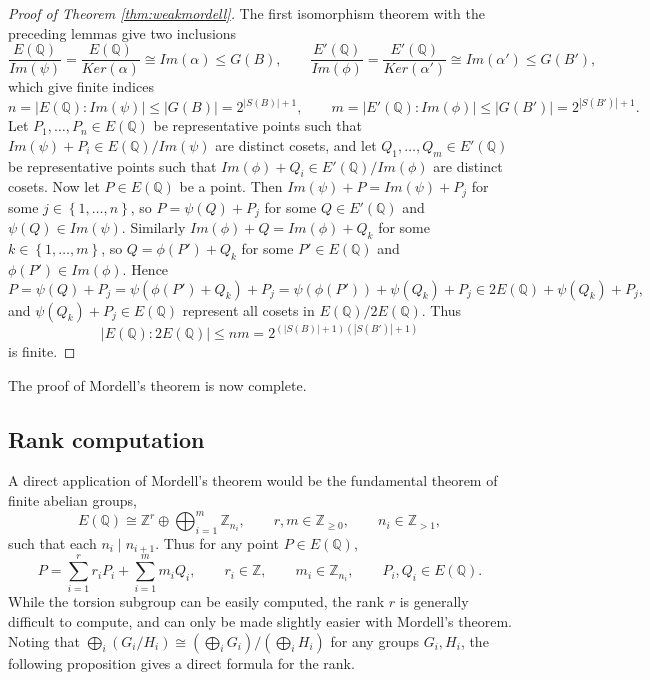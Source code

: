 \documentclass{article}
\newcommand{\Z}{\mathbb{Z}}
\newcommand{\Q}{\mathbb{Q}}
\newcommand{\rb}[1]{\left( #1 \right)}
\newcommand{\cb}[1]{\left\{ #1 \right\}}
\newcommand{\abs}[1]{\left\lvert #1 \right\rvert}
\theoremstyle{definition}\newtheorem*{definition}{Definition}
\theoremstyle{definition}\newtheorem*{example}{Example}
\theoremstyle{definition}\newtheorem*{remark}{Remark}
\begin{document}
\begin{proof}[Proof of Theorem \ref{thm:weakmordell}]
The first isomorphism theorem with the preceding lemmas give two inclusions
$$ \dfrac{E\rb{\Q}}{Im\rb{\psi}} = \dfrac{E\rb{\Q}}{Ker\rb{\alpha}} \cong Im\rb{\alpha} \le G\rb{B}, \qquad \dfrac{E'\rb{\Q}}{Im\rb{\phi}} = \dfrac{E'\rb{\Q}}{Ker\rb{\alpha'}} \cong Im\rb{\alpha'} \le G\rb{B'}, $$
which give finite indices
$$ n = \abs{E\rb{\Q} : Im\rb{\psi}} \le \abs{G\rb{B}} = 2^{\abs{S\rb{B}} + 1}, \qquad m = \abs{E'\rb{\Q} : Im\rb{\phi}} \le \abs{G\rb{B'}} = 2^{\abs{S\rb{B'}} + 1}. $$
Let $ P_1, \dots, P_n \in E\rb{\Q} $ be representative points such that $ Im\rb{\psi} + P_i \in E\rb{\Q} / Im\rb{\psi} $ are distinct cosets, and let $ Q_1, \dots, Q_m \in E'\rb{\Q} $ be representative points such that $ Im\rb{\phi} + Q_i \in E'\rb{\Q} / Im\rb{\phi} $ are distinct cosets. Now let $ P \in E\rb{\Q} $ be a point. Then $ Im\rb{\psi} + P = Im\rb{\psi} + P_j $ for some $ j \in \cb{1, \dots, n} $, so $ P = \psi\rb{Q} + P_j $ for some $ Q \in E'\rb{\Q} $ and $ \psi\rb{Q} \in Im\rb{\psi} $. Similarly $ Im\rb{\phi} + Q = Im\rb{\phi} + Q_k $ for some $ k \in \cb{1, \dots, m} $, so $ Q = \phi\rb{P'} + Q_k $ for some $ P' \in E\rb{\Q} $ and $ \phi\rb{P'} \in Im\rb{\phi} $. Hence
$$ P = \psi\rb{Q} + P_j = \psi\rb{\phi\rb{P'} + Q_k} + P_j = \psi\rb{\phi\rb{P'}} + \psi\rb{Q_k} + P_j \in 2E\rb{\Q} + \psi\rb{Q_k} + P_j, $$
and $ \psi\rb{Q_k} + P_j \in E\rb{\Q} $ represent all cosets in $ E\rb{\Q} / 2E\rb{\Q} $. Thus
$$ \abs{E\rb{\Q} : 2E\rb{\Q}} \le nm = 2^{\rb{\abs{S\rb{B}} + 1}\rb{\abs{S\rb{B'}} + 1}} $$
is finite.
\end{proof}

The proof of Mordell's theorem is now complete.

\pagebreak

\subsection{Rank computation}

A direct application of Mordell's theorem would be the fundamental theorem of finite abelian groups,
$$ E\rb{\Q} \cong \Z^r \oplus \bigoplus_{i = 1}^m \Z_{n_i}, \qquad r, m \in \Z_{\ge 0}, \qquad n_i \in \Z_{> 1}, $$
such that each $ n_i \mid n_{i + 1} $. Thus for any point $ P \in E\rb{\Q} $,
$$ P = \sum_{i = 1}^r r_iP_i + \sum_{i = 1}^m m_iQ_i, \qquad r_i \in \Z, \qquad m_i \in \Z_{n_i}, \qquad P_i, Q_i \in E\rb{\Q}. $$
While the torsion subgroup can be easily computed, the rank $ r $ is generally difficult to compute, and can only be made slightly easier with Mordell's theorem. Noting that $ \bigoplus_i \rb{G_i / H_i} \cong \rb{\bigoplus_i G_i} / \rb{\bigoplus_i H_i} $ for any groups $ G_i, H_i $, the following proposition gives a direct formula for the rank.
\end{document}
